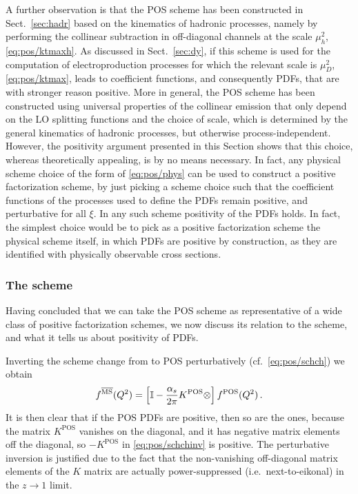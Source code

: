 A further observation is that the POS
scheme has been constructed in Sect.~\ref{sec:hadr} based on the kinematics of hadronic processes,
namely by performing the collinear subtraction in off-diagonal
channels at the scale  $\mu_h^2$,
\cref{eq:pos/ktmaxh}. As discussed in Sect.~\ref{sec:dy}, if this
scheme is used for the computation of electroproduction processes for
which the relevant scale is $\mu_D^2$, \cref{eq:pos/ktmax}, leads
to coefficient functions, and consequently PDFs, that are with stronger
reason positive. More in general, the POS scheme has been constructed
using universal properties of the collinear emission that only
depend on the LO splitting functions and the choice of scale, which is
determined by the general kinematics of hadronic processes, but
otherwise process-independent. However, the positivity argument
presented in this Section shows that this choice, whereas theoretically
appealing, is by no means necessary. In fact, any physical scheme
choice of the form of \cref{eq:pos/phys} can be used to construct a
positive factorization scheme, by just picking a scheme choice such
that the coefficient functions of the processes used to define the
PDFs remain positive, and perturbative for all $\xi$.
In any such scheme positivity of the PDFs
holds. In fact, the simplest choice would be to pick as a
positive factorization scheme the physical scheme itself, in which
PDFs are positive by construction, as they are identified with
physically observable cross sections.

\subsubsection{The \msbar{} scheme}
\label{sec:posmsbar}


Having concluded that we can take the POS scheme as representative of
a wide class of positive factorization schemes, we now discuss 
its relation to the \msbar{} scheme, and what it
tells us about positivity of \msbar{} PDFs.

Inverting the scheme change from \msbar{} to POS perturbatively (cf.\ \cref{eq:pos/schch})
we obtain
\begin{equation}
  \label{eq:pos/schchinv}
 f^{{\overline{\textrm{MS}}}}(Q^2)=\left[\mathbb{I}
  -\frac{\alpha_s}{2\pi}  K^{\textrm{POS}}\otimes \right]  f^{\textrm{POS}}(Q^2) \,.
\end{equation}
It is then clear that if the POS PDFs are positive, then so are the
\msbar{} ones, because the matrix $K^{\textrm{POS}}$ vanishes on the
diagonal, and it has negative matrix elements off the diagonal, so
$-K^{\textrm{POS}}$ in \cref{eq:pos/schchinv} is positive.
The perturbative inversion is justified due to the fact that the
non-vanishing off-diagonal matrix elements of the $K$ matrix are
actually power-suppressed (i.e.\ next-to-eikonal) in the $z\to 1$
limit.

